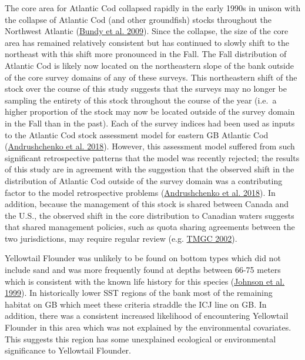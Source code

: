 \documentclass[
]{article}
\begin{document}
The core area for Atlantic Cod collapsed rapidly in the early 1990s in unison with the collapse of Atlantic Cod (and other groundfish) stocks throughout the Northwest Atlantic (\protect\hyperlink{ref-bundySealsCodForage2009}{Bundy et al. 2009}). Since the collapse, the size of the core area has remained relatively consistent but has continued to slowly shift to the northeast with this shift more pronounced in the Fall. The Fall distribution of Atlantic Cod is likely now located on the northeastern slope of the bank outside of the core survey domains of any of these surveys. This northeastern shift of the stock over the course of this study suggests that the surveys may no longer be sampling the entirety of this stock throughout the course of the year (i.e.~a higher proportion of the stock may now be located outside of the survey domain in the Fall than in the past). Each of the survey indices had been used as inputs to the Atlantic Cod stock assessment model for eastern GB Atlantic Cod (\protect\hyperlink{ref-andrushchenkoAssessmentEasternGeorges2018}{Andrushchenko et al. 2018}). However, this assessment model suffered from such significant retrospective patterns that the model was recently rejected; the results of this study are in agreement with the suggestion that the observed shift in the distribution of Atlantic Cod outside of the survey domain was a contributing factor to the model retrospective problems (\protect\hyperlink{ref-andrushchenkoAssessmentEasternGeorges2018}{Andrushchenko et al. 2018}). In addition, because the management of this stock is shared between Canada and the U.S., the observed shift in the core distribution to Canadian waters suggests that shared management policies, such as quota sharing agreements between the two jurisdictions, may require regular review (e.g. \protect\hyperlink{ref-tmgcDevelopmentSharingAllocation2002}{TMGC 2002}).

Yellowtail Flounder was unlikely to be found on bottom types which did not include sand and was more frequently found at depths between 66-75 meters which is consistent with the known life history for this species (\protect\hyperlink{ref-johnsonYellowtailFlounderLimanda1999}{Johnson et al. 1999}). In historically lower SST regions of the bank most of the remaining habitat on GB which meet these criteria straddle the ICJ line on GB. In addition, there was a consistent increased likelihood of encountering Yellowtail Flounder in this area which was not explained by the environmental covariates. This suggests this region has some unexplained ecological or environmental significance to Yellowtail Flounder.
\end{document}
